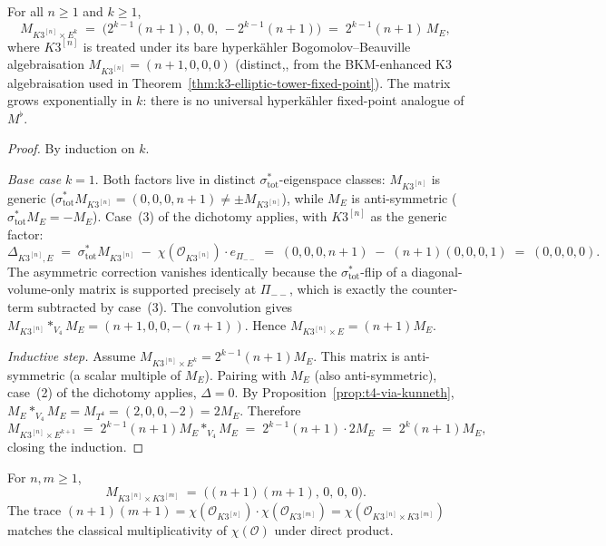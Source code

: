 \begin{theorem}
\label{thm:hyperkahler-elliptic-doubling}
For all $n \geq 1$ and $k \geq 1$,
\[
 \boxed{\;
 M_{K3^{[n]} \times E^k}
 \;=\; \bigl(2^{k - 1} (n + 1),\, 0,\, 0,\, -2^{k - 1} (n + 1)\bigr)
 \;=\; 2^{k - 1} (n + 1)\, M_E,
 \;}
\]
where $K3^{[n]}$ is treated under its bare hyperk\"ahler Bogomolov--Beauville
algebraisation $M_{K3^{[n]}} = (n + 1, 0, 0, 0)$
\textup{(}distinct,, from the BKM-enhanced K$3$
algebraisation used in
Theorem~\ref{thm:k3-elliptic-tower-fixed-point}\textup{).} The
matrix grows exponentially in $k$: there is no universal hyperk\"ahler
fixed-point analogue of $M^\flat$.
\end{theorem}

\begin{proof}[Proof]
By induction on $k$.

\textit{Base case} $k = 1$. Both factors live in distinct
$\sigma_{\mathrm{tot}}^*$-eigenspace classes: $M_{K3^{[n]}}$ is
generic ($\sigma_{\mathrm{tot}}^* M_{K3^{[n]}} = (0, 0, 0, n + 1) \neq
\pm M_{K3^{[n]}}$), while $M_E$ is anti-symmetric
($\sigma_{\mathrm{tot}}^* M_E = -M_E$). Case~(3) of the dichotomy
applies, with $K3^{[n]}$ as the generic factor:
\[
 \Delta_{K3^{[n]}, E}
 \;=\; \sigma_{\mathrm{tot}}^* M_{K3^{[n]}}
 \;-\; \chi(\mathcal{O}_{K3^{[n]}}) \cdot e_{\Pi_{--}}
 \;=\; (0, 0, 0, n + 1) \;-\; (n + 1)(0, 0, 0, 1)
 \;=\; (0, 0, 0, 0).
\]
The asymmetric correction vanishes identically because the
$\sigma_{\mathrm{tot}}^*$-flip of a diagonal-volume-only matrix
is supported precisely at $\Pi_{--}$, which is exactly the
counter-term subtracted by case~(3). The convolution gives
$M_{K3^{[n]}} *_{V_4} M_E = (n + 1, 0, 0, -(n + 1))$. Hence
$M_{K3^{[n]} \times E} = (n + 1) M_E$.

\textit{Inductive step.} Assume $M_{K3^{[n]} \times E^k}
= 2^{k - 1} (n + 1) M_E$. This matrix is anti-symmetric
\textup{(}a scalar multiple of $M_E$\textup{).} Pairing with $M_E$
\textup{(}also anti-symmetric\textup{),} case~(2) of the dichotomy
applies, $\Delta = 0$. By
Proposition~\ref{prop:t4-via-kunneth}, $M_E *_{V_4} M_E = M_{T^4}
= (2, 0, 0, -2) = 2 M_E$. Therefore
\[
 M_{K3^{[n]} \times E^{k + 1}}
 \;=\; 2^{k - 1} (n + 1) M_E *_{V_4} M_E
 \;=\; 2^{k - 1} (n + 1) \cdot 2 M_E
 \;=\; 2^k (n + 1) M_E,
\]
closing the induction.
\end{proof}

\begin{proposition}
\label{prop:hyperkahler-product-matrix}
For $n, m \geq 1$,
\[
 \boxed{\;
 M_{K3^{[n]} \times K3^{[m]}}
 \;=\; \bigl((n + 1)(m + 1),\, 0,\, 0,\, 0\bigr).
 \;}
\]
The trace $(n + 1)(m + 1)
= \chi(\mathcal{O}_{K3^{[n]}}) \cdot \chi(\mathcal{O}_{K3^{[m]}})
= \chi(\mathcal{O}_{K3^{[n]} \times K3^{[m]}})$ matches the
classical multiplicativity of $\chi(\mathcal{O})$ under direct product.
\end{proposition}

